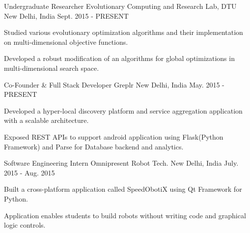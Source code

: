 \begin{cventries}
  \cventry
    {Undergraduate Researcher}
    {Evolutionary Computing and Research Lab, DTU}
    {New Delhi, India}
    {Sept. 2015 - PRESENT}
    {
      \begin{cvitems}
        \item {Studied various evolutionary optimization algorithms and their implementation on multi-dimensional objective functions.}
        \item {Developed a robust modification of an algorithms for global optimizations in multi-dimensional search space.}
      \end{cvitems}
    }
  \cventry
    {Co-Founder \& Full Stack Developer}
    {Greplr}
    {New Delhi, India}
    {May. 2015 - PRESENT}
    {
      \begin{cvitems}
        \item {Developed a hyper-local discovery platform and service aggregation application with a scalable architecture.}
        \item {Exposed REST APIs to support android application using Flask(Python Framework) and Parse for Database backend and analytics.}
      \end{cvitems}
    }
  \cventry
    {Software Engineering Intern}
    {Omnipresent Robot Tech.}
    {New Delhi, India}
    {July. 2015 - Aug. 2015}
    {
      \begin{cvitems}
        \item {Built a cross-platform application called SpeedObotiX using Qt Framework for Python.}
        \item {Application enables students to build robots without writing code and graphical logic controls.}
      \end{cvitems} 
    }
\end{cventries}
